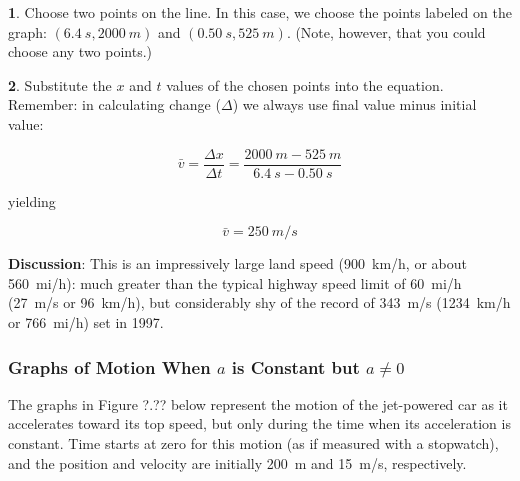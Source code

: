 \documentclass[dvipsnames]{article}
\begin{document}
\vspace{1em}

\textbf{1}. Choose two points on the line. In this case, we choose the points labeled on the graph: $\left(\SI{6.4}{s}, \SI{2000}{m}\right)$ and $\left(\SI{0.50}{s}, \SI{525}{m}\right)$. (Note, however, that you could choose any two points.)

\vspace{1em}

\textbf{2}. Substitute the $x$ and $t$ values of the chosen points into the equation. Remember: in calculating change ($\Delta$) we always use final value minus initial value:

\begin{equation*}
    \bar{v} = \frac{\Delta x}{\Delta t} = \frac{\SI{2000}{m} - 
    \SI{525}{m}}{\SI{6.4}{s} - \SI{0.50}{s}}
\end{equation*}

yielding

\begin{equation*}
    \bar{v} = \SI{250}{m/s}
\end{equation*}

\textbf{Discussion}: This is an impressively large land speed (\SI{900}{km/h}, or about \SI{560}{mi/h}): much greater than the typical highway speed limit of \SI{60}{mi/h} (\SI{27}{m/s} or \SI{96}{km/h}), but considerably shy of the record of \SI{343}{m/s} (\SI{1234}{km/h} or \SI{766}{mi/h}) set in 1997.

\endsolution

\subsubsection*{Graphs of Motion When $a$ is Constant but $a \neq 0$}

The graphs in Figure ?.?? below represent the motion of the jet-powered car as it accelerates toward its top speed, but only during the time when its acceleration is constant. Time starts at zero for this motion (as if measured with a stopwatch), and the position and velocity are initially \SI{200}{m} and \SI{15}{m/s}, respectively.
\end{document}
